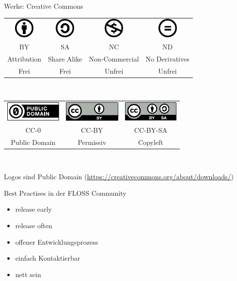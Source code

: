 \begin{frame}{Werke: Creative Commons}
	\begin{center}
	\begin{tabular}{cccc}
		\includegraphics[height=1cm]{res/by.pdf}
		&
		\includegraphics[height=1cm]{res/sa.pdf}
		&
		\includegraphics[height=1cm]{res/nc.pdf}
		&
		\includegraphics[height=1cm]{res/nd.pdf}
	\\
		BY
		&
		SA
		&
		NC
		&
		ND
	\\
		Attribution
		&
		Share Alike
		&
		Non-Commercial
		&
		No Derivatives
	\\
		Frei
		&
		Frei
		&
		Unfrei
		&
		Unfrei
	\end{tabular} 
	\\
	\vspace{1cm}
	\begin{tabular}{ccc}
		\includegraphics[height=1cm]{res/cc-zero.pdf}
		&
		\includegraphics[height=1cm]{res/cc-by.pdf}
		&
		\includegraphics[height=1cm]{res/cc-by-sa.pdf}
	\\
		CC-0
		&
		CC-BY
		&
		CC-BY-SA
	\\
		Public Domain
		&
		Permissiv
		&
		Copyleft
	\end{tabular} 
	\\
	\vspace{1cm}
	\end{center}
\end{frame}
\note
{
	Logos sind Public Domain (\url{https://creativecommons.org/about/downloads/})
}

\begin{frame}{Best Practises in der FLOSS Community}
	\begin{itemize}
		\item release early
		\item release often
		\item offener Entwicklungsprozess
		\item einfach Kontaktierbar
		\item nett sein
	\end{itemize}
\end{frame}

